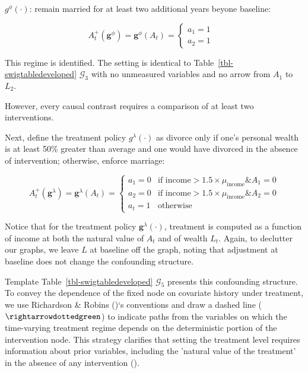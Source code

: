 \documentclass[
  single column]{article}
\begin{document}
\(g^\phi(\cdot)\): remain married for at least two additional years
beyone baseline:

\[
A_t^{+}(\mathbf{g}^\phi) = \mathbf{g}^\phi (A_{t}) = \begin{cases} 
   a_{1} = 1 & \\ 
   a_{2} = 1 &   
\end{cases}
\]

This regime is identified. The setting is identical to
Table~\ref{tbl-swigtabledeveloped} \(\mathcal{G}_3\) with no unmeasured
variables and no arrow from \(A_1\) to \(L_2\).

However, every causal contrast requires a comparison of at least two
interventions.

Next, define the treatment policy \(g^{\lambda}(\cdot)\) as divorce only
if one's personal wealth is at least 50\% greater than average and one
would have divorced in the absence of intervention; otherwise, enforce
marriage:

\[
A_t^{+}(\mathbf{g}^{\lambda}) = \mathbf{g}^{\lambda}(A_{t}) = \begin{cases} 
   a_{1} = 0 & \text{if income} > 1.5 \times  \mu_{\text{income}} \& A_1 = 0 \\ 
   a_{2} = 0 & \text{if income} > 1.5 \times  \mu_{\text{income}} \& A_2 = 0 \\ 
   a_{t} = 1 & \text{otherwise} 
\end{cases}
\]

Notice that for the treatment policy \(\mathbf{g}^\lambda(\cdot)\),
treatment is computed as a function of income at both the natural value
of \(A_t\) and of wealth \(L_t\). Again, to declutter our graphs, we
leave \(L\) at baseline off the graph, noting that adjustment at
baseline does not change the confounding structure.

Template Table~\ref{tbl-swigtabledeveloped} \(\mathcal{G}_5\) presents
this confounding structure. To convey the dependence of the fixed node
on covariate history under treatment, we use Richardson \& Robins
()`s conventions and draw a dashed
line (\(\rightarrowdottedgreen\)) to indicate paths from the variables
on which the time-varying treatment regime depends on the deterministic
portion of the intervention node. This strategy clarifies that setting
the treatment level requires information about prior variables,
including the 'natural value of the treatment' in the absence of any
intervention ().
\end{document}
